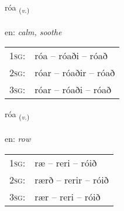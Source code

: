 \documentclass[frontgrid, backgrid]{flacards}\usepackage[]{graphicx}\usepackage[]{xcolor}
\begin{document}
\renewcommand{\flhead}{\vskip5pt \fboxsep=0pt {\small\bfseries\footnotesize Sagnorð | Verb}}
\renewcommand{\fcfoot}{\vskip5pt \fboxsep=0pt \hspace{2pt}{\small\bfseries\footnotesize 3K}}

\renewcommand{\blhead}{\vskip5pt {\small\bfseries\footnotesize Sagnorð | Verb }}
\renewcommand{\bcfoot}{\vskip5pt \hspace{2pt}{\small\bfseries\footnotesize 3K}}


{róa \small{\textsubscript{(\textit{v.})}} \\[1ex] %
\textphonetic{[rouːa]} \\
en: \emph{calm, soothe} \\  [2ex]
\renewcommand*{\arraystretch}{0.8}
\begin{tabular}{p{1cm}l}
\textsc{1sg}: & róa -- róaði -- róað \\ 
\textsc{2sg}: & róar -- róaðir -- róað \\ 
\textsc{3sg}: & róar -- róaði -- róað \\ 
\end{tabular}
}

\renewcommand{\flhead}{\vskip5pt \fboxsep=0pt {\small\bfseries\footnotesize Sagnorð | Verb}}
\renewcommand{\fcfoot}{\vskip5pt \fboxsep=0pt \hspace{2pt}{\small\bfseries\footnotesize 3K}}

\renewcommand{\blhead}{\vskip5pt {\small\bfseries\footnotesize Sagnorð | Verb }}
\renewcommand{\bcfoot}{\vskip5pt \hspace{2pt}{\small\bfseries\footnotesize 3K}}


{róa \small{\textsubscript{(\textit{v.})}} \\[1ex] %
\textphonetic{[rouːa]} \\
en: \emph{row} \\  [2ex]
\renewcommand*{\arraystretch}{0.8}
\begin{tabular}{p{1cm}l}
\textsc{1sg}: & ræ -- reri -- róið \\ 
\textsc{2sg}: & rærð -- rerir -- róið \\ 
\textsc{3sg}: & rær -- reri -- róið \\ 
\end{tabular}
}
\end{document}
